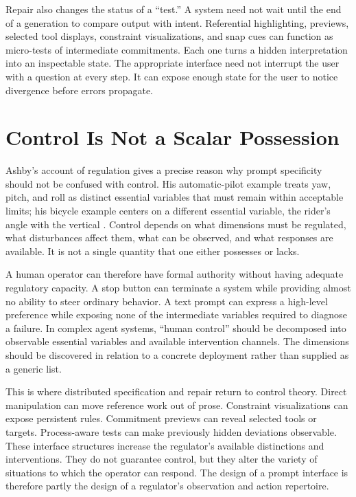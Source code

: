 \documentclass[11pt]{article}
\begin{document}
Repair also changes the status of a ``test.'' A system need not wait until the end of a generation to compare output with intent. Referential highlighting, previews, selected tool displays, constraint visualizations, and snap cues can function as micro-tests of intermediate commitments. Each one turns a hidden interpretation into an inspectable state. The appropriate interface need not interrupt the user with a question at every step. It can expose enough state for the user to notice divergence before errors propagate.

\section{Control Is Not a Scalar Possession}

Ashby's account of regulation gives a precise reason why prompt specificity should not be confused with control. His automatic-pilot example treats yaw, pitch, and roll as distinct essential variables that must remain within acceptable limits; his bicycle example centers on a different essential variable, the rider's angle with the vertical \citep{ashby1956introduction}. Control depends on what dimensions must be regulated, what disturbances affect them, what can be observed, and what responses are available. It is not a single quantity that one either possesses or lacks.

A human operator can therefore have formal authority without having adequate regulatory capacity. A stop button can terminate a system while providing almost no ability to steer ordinary behavior. A text prompt can express a high-level preference while exposing none of the intermediate variables required to diagnose a failure. In complex agent systems, ``human control'' should be decomposed into observable essential variables and available intervention channels. The dimensions should be discovered in relation to a concrete deployment rather than supplied as a generic list.

This is where distributed specification and repair return to control theory. Direct manipulation can move reference work out of prose. Constraint visualizations can expose persistent rules. Commitment previews can reveal selected tools or targets. Process-aware tests can make previously hidden deviations observable. These interface structures increase the regulator's available distinctions and interventions. They do not guarantee control, but they alter the variety of situations to which the operator can respond. The design of a prompt interface is therefore partly the design of a regulator's observation and action repertoire.
\end{document}

